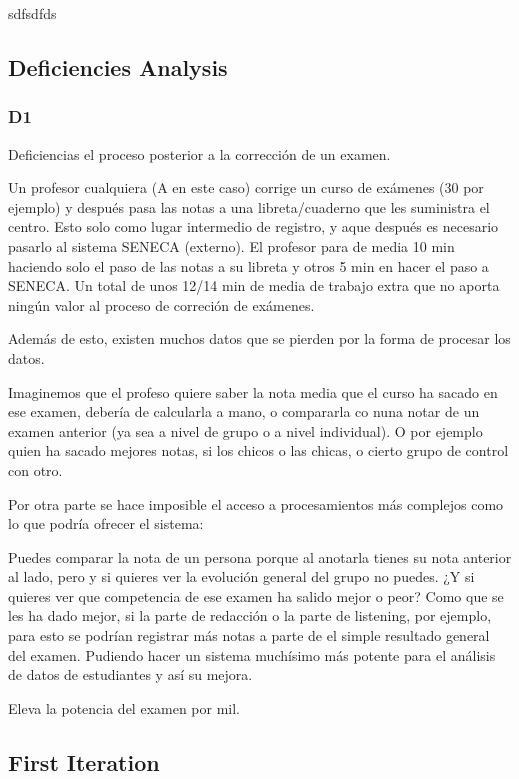 \documentclass[oneside,english,titlepage]{scrbook}
\begin{document}
sdfsdfds

\subsection{Deficiencies Analysis}

\subsubsection{D1}

Deficiencias el proceso posterior a la corrección de un examen.

Un profesor cualquiera (A en este caso) corrige un curso de exámenes (30 por ejemplo) y después pasa las notas a una libreta/cuaderno que les suministra el centro. Esto solo como lugar intermedio de registro, y aque después es necesario pasarlo al sistema SENECA (externo).
El profesor para de media 10 min haciendo solo el paso de las notas a su libreta y otros 5 min en hacer el paso a SENECA. Un total de unos 12/14 min de media de trabajo extra que no aporta ningún valor al proceso de correción de exámenes.

Además de esto, existen muchos datos que se pierden por la forma de procesar los datos. 

Imaginemos que el profeso quiere saber la nota media que el curso ha sacado en ese examen, debería de calcularla a mano, o compararla co nuna notar de un examen anterior (ya sea a nivel de grupo o a nivel individual). O por ejemplo quien ha sacado mejores notas, si los chicos o las chicas, o cierto grupo de control con otro. 

Por otra parte se hace imposible el acceso a procesamientos más complejos como lo que podría ofrecer el sistema:

Puedes comparar la nota de un persona porque al anotarla tienes su nota anterior al lado, pero y si quieres ver la evolución general del grupo no puedes.
¿Y si quieres ver que competencia de ese examen ha salido mejor o peor? Como que se les ha dado mejor, si la parte de redacción o la parte de listening, por ejemplo, para esto se podrían registrar más notas a parte de el simple resultado general del examen. Pudiendo hacer un sistema muchísimo más 
potente para el análisis de datos de estudiantes y así su mejora.

Eleva la potencia del examen por mil.






\subsection{First Iteration}
\end{document}
